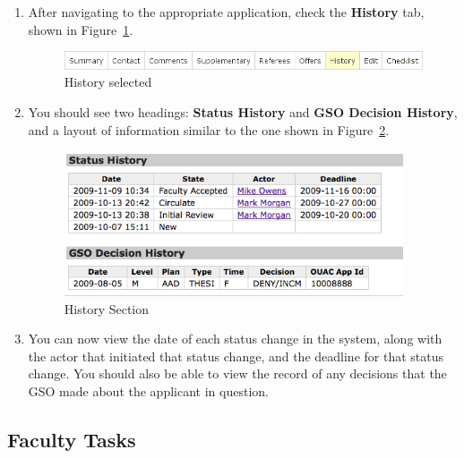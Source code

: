 \documentclass[titlepage]{article}
\begin{document}
\begin{enumerate}
\item After navigating to the appropriate application, check the \textbf{\textsf{History}} tab, shown in Figure~\ref{tHistory}.

\begin{figure}[h!]
  \begin{center}
  \includegraphics[width=15cm]{apptabs_history.png}
  \end{center}
  \caption{History selected}
  \label{tHistory}
\end{figure}

\item You should see two headings: \textbf{\textsf{Status History}} and \textbf{\textsf{GSO Decision History}}, and a layout of information similar to the one shown in Figure~\ref{tHistory2}.

\begin{figure}[h!]
  \begin{center}
  \includegraphics[width=10cm]{history_section.png}
  \end{center}
  \caption{History Section}
  \label{tHistory2}
\end{figure}

\item You can now view the date of each status change in the system, along with the actor that initiated that status change, and the deadline for that status change. You should also be able to view the record of any decisions that the GSO made about the applicant in question.

\end{enumerate}

\subsection{Faculty Tasks}
\end{document}
